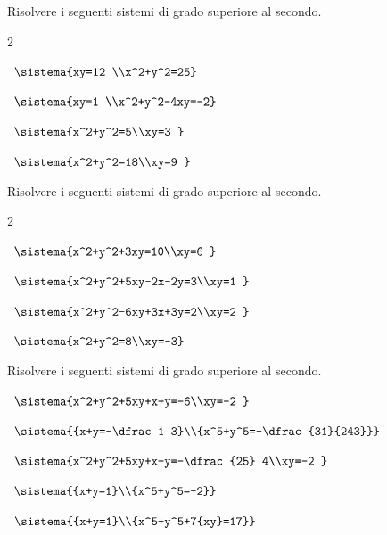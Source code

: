 \begin{esercizio}[*]
\label{ese:6.33}
Risolvere i seguenti sistemi di grado superiore al secondo.
\begin{htmulticols}{2}
\begin{enumeratea}
\item~\(\sistema{xy=12 \\x^2+y^2=25}\)
\item~\(\sistema{xy=1 \\x^2+y^2-4xy=-2}\)
\item~\(\sistema{x^2+y^2=5\\xy=3 }\)
\item~\(\sistema{x^2+y^2=18\\xy=9 }\)
\end{enumeratea}
\end{htmulticols}
\end{esercizio}

\begin{esercizio}[*]
\label{ese:6.34}
Risolvere i seguenti sistemi di grado superiore al secondo.
\begin{htmulticols}{2}
\begin{enumeratea}
\item~\(\sistema{x^2+y^2+3xy=10\\xy=6 }\)
\item~\(\sistema{x^2+y^2+5xy-2x-2y=3\\xy=1 
}\)
\item~\(\sistema{x^2+y^2-6xy+3x+3y=2\\xy=2 
}\)
\item~\(\sistema{x^2+y^2=8\\xy=-3}\)
\end{enumeratea}
\end{htmulticols}
\end{esercizio}

\begin{esercizio}[*]
\label{ese:6.35}
Risolvere i seguenti sistemi di grado superiore al secondo.
\begin{enumeratea}
\item~\(\sistema{x^2+y^2+5xy+x+y=-6\\xy=-2 
}\)
\item~\(\sistema{{x+y=-\dfrac 1 
3}\\{x^5+y^5=-\dfrac{31}{243}}}\)
\item~\(\sistema{x^2+y^2+5xy+x+y=-\dfrac{25} 4\\xy=-2 
}\)
\item~\(\sistema{{x+y=1}\\{x^5+y^5=-2}}\)


\item~\(\sistema{{x+y=1}\\{x^5+y^5+7{xy}=17}}\)
\end{enumeratea}
\end{esercizio}


